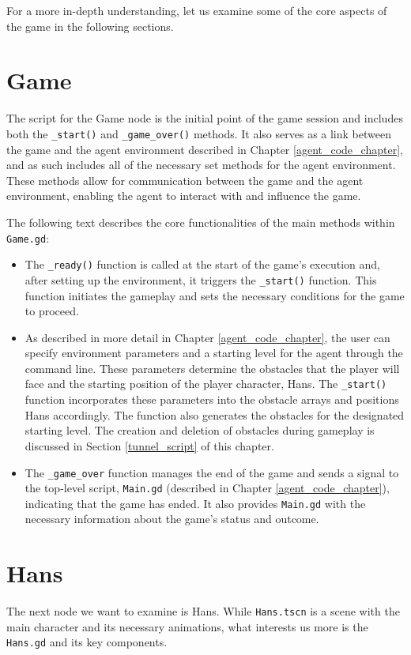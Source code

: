 For a more in-depth understanding, let us examine some of the core aspects of the game in the following sections.

\section{Game}
The script for the Game node is the initial point of the game session and includes both the \texttt{\_start()} and \texttt{\_game\_over()} methods. It also serves as a link between the game and the agent environment described in Chapter \ref{agent_code_chapter}, and as such includes all of the necessary set methods for the agent environment. These methods allow for communication between the game and the agent environment, enabling the agent to interact with and influence the game.

The following text describes the core functionalities of the main methods within \texttt{Game.gd}:
\begin{itemize}
\item The \texttt{\_ready()} function is called at the start of the game's execution and, after setting up the environment, it triggers the \texttt{\_start()} function. This function initiates the gameplay and sets the necessary conditions for the game to proceed.
\item As described in more detail in Chapter \ref{agent_code_chapter}, the user can specify environment parameters and a starting level for the agent through the command line. These parameters determine the obstacles that the player will face and the starting position of the player character, Hans. The \texttt{\_start()} function incorporates these parameters into the obstacle arrays and positions Hans accordingly. The function also generates the obstacles for the designated starting level. The creation and deletion of obstacles during gameplay is discussed in Section \ref{tunnel_script} of this chapter.
\item The \texttt{\_game\_over} function manages the end of the game and sends a signal to the top-level script, \texttt{Main.gd} (described in Chapter \ref{agent_code_chapter}), indicating that the game has ended. It also provides \texttt{Main.gd} with the necessary information about the game's status and outcome.
\end{itemize}

\section{Hans}
The next node we want to examine is Hans. While \texttt{Hans.tscn} is a scene with the main character and its necessary animations, what interests us more is the \texttt{Hans.gd} and its key components.

